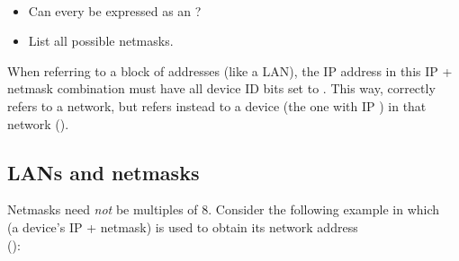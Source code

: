 \begin{exercise}\ \\[-0.65cm]
\begin{itemize}
\item Can every  be expressed as an ?
\item List all possible netmasks.\\[-0.5cm]
\end{itemize}
\end{exercise}

When referring to a block of addresses (like a LAN), 
the IP address in this IP + netmask combination
must have all device ID bits set to . 
This way,  correctly refers to a network, but
 refers instead to a device 
(the one with IP ) in that network ().

\subsection{LANs and netmasks}\label{sec:layer3:lans_and_netmasks}

Netmasks need \textit{not} be multiples of $8$. Consider the following example in which \\
 (a device's IP + netmask) is used to obtain its network address\\
():\\

